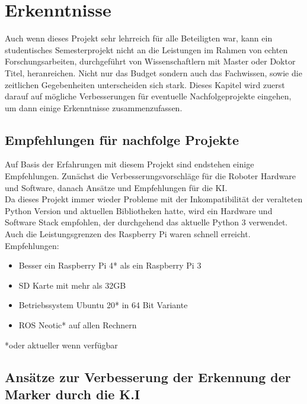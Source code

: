 \documentclass[conference]{IEEEtran}
\begin{document}
	\section{Erkenntnisse }
	Auch wenn dieses Projekt sehr lehrreich für alle Beteiligten war, kann ein studentisches Semesterprojekt nicht an die Leistungen im Rahmen von echten Forschungsarbeiten, durchgeführt von Wissenschaftlern mit Master oder Doktor Titel, heranreichen. Nicht nur das Budget sondern auch das Fachwissen, sowie die zeitlichen Gegebenheiten unterscheiden sich stark. Dieses Kapitel wird zuerst darauf auf mögliche Verbesserungen für eventuelle Nachfolgeprojekte eingehen, um dann einige Erkenntnisse zusammenzufassen. 
	
	\subsection{Empfehlungen für nachfolge Projekte}
	
	 Auf Basis der Erfahrungen mit diesem Projekt sind endstehen einige 
	 Empfehlungen. Zunächst die Verbesserungsvorschläge für die Roboter 
	 Hardware und Software, danach Ansätze  und Empfehlungen für die KI.\\
	Da dieses Projekt immer wieder Probleme mit der Inkompatibilität der veralteten Python Version und aktuellen Bibliotheken hatte, wird ein Hardware und Software Stack empfohlen, der durchgehend das aktuelle Python 3 verwendet. Auch die Leistungsgrenzen des Raspberry Pi waren schnell erreicht. \\
	
	Empfehlungen:
	\begin{itemize}
		\item  Besser ein Raspberry Pi 4* als ein Raspberry Pi 3
		\item  SD Karte mit mehr als 32GB
		\item Betriebssystem Ubuntu 20* in 64 Bit Variante
		\item  ROS Neotic* auf allen Rechnern
	\end{itemize}
	*oder aktueller wenn verfügbar
	\subsection{Ansätze zur Verbesserung der Erkennung der Marker durch die K.I}
	
\end{document}
